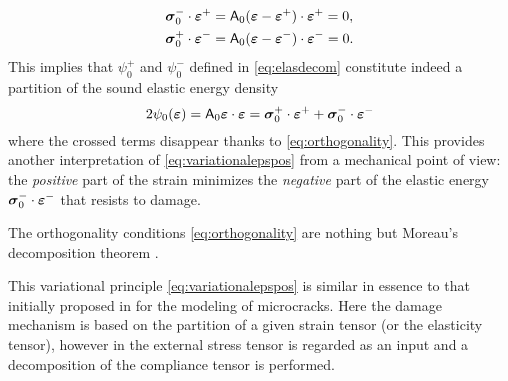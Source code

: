 \begin{equation} \label{eq:orthogonality}
\begin{aligned}
\sig_0^-\cdot\eps^+ &= \tens{A}_0(\eps-\eps^+)\cdot\eps^+=0, \\
\sig_0^+\cdot\eps^- &= \tens{A}_0(\eps-\eps^-)\cdot\eps^-=0.
\end{aligned}
\end{equation}
This implies that $\psi_0^+$ and $\psi_0^-$ defined in \eqref{eq:elasdecom} constitute indeed a partition of the sound elastic energy density
\[
2\psi_0(\eps)=\tens{A}_0\eps\cdot\eps=\sig_0^+\cdot\eps^++\sig_0^-\cdot\eps^-
\]
where the crossed terms disappear thanks to \eqref{eq:orthogonality}. This provides another interpretation of \eqref{eq:variationalepspos} from a mechanical point of view: the \emph{positive} part of the strain minimizes the \emph{negative} part of the elastic energy $\sig_0^-\cdot\eps^-$ that resists to damage.

\begin{remark}
The orthogonality conditions \eqref{eq:orthogonality} are nothing but Moreau's decomposition theorem \cite{Moreau:1962}.
\end{remark}

\begin{remark}
This variational principle \eqref{eq:variationalepspos} is similar in essence to that initially proposed in \cite{Ortiz:1985} for the modeling of microcracks. Here the damage mechanism is based on the partition of a given strain tensor (or the elasticity tensor), however in \cite{Ortiz:1985} the external stress tensor is regarded as an input and a decomposition of the compliance tensor is performed.
\end{remark}

